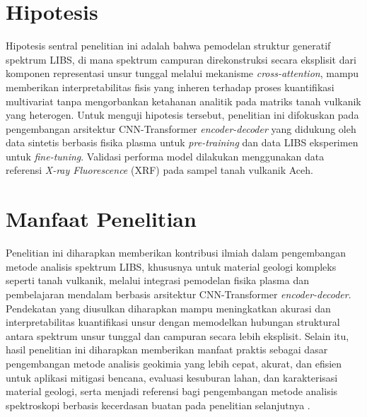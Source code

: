 \section{Hipotesis}

Hipotesis sentral penelitian ini adalah bahwa pemodelan struktur generatif spektrum LIBS, di mana spektrum campuran direkonstruksi secara eksplisit dari komponen representasi unsur tunggal melalui mekanisme \textit{cross-attention}, mampu memberikan interpretabilitas fisis yang inheren terhadap proses kuantifikasi multivariat tanpa mengorbankan ketahanan analitik pada matriks tanah vulkanik yang heterogen. Untuk menguji hipotesis tersebut, penelitian ini difokuskan pada pengembangan arsitektur CNN-Transformer \textit{encoder-decoder} yang didukung oleh data sintetis berbasis fisika plasma untuk \textit{pre-training} dan data LIBS eksperimen untuk \textit{fine-tuning}. Validasi performa model dilakukan menggunakan data referensi \textit{X-ray Fluorescence} (XRF) pada sampel tanah vulkanik Aceh.

\section{Manfaat Penelitian}
Penelitian ini diharapkan memberikan kontribusi ilmiah dalam pengembangan metode analisis spektrum LIBS, khususnya untuk material geologi kompleks seperti tanah vulkanik, melalui integrasi pemodelan fisika plasma dan pembelajaran mendalam berbasis arsitektur CNN-Transformer \textit{encoder-decoder}. Pendekatan yang diusulkan diharapkan mampu meningkatkan akurasi dan interpretabilitas kuantifikasi unsur dengan memodelkan hubungan struktural antara spektrum unsur tunggal dan campuran secara lebih eksplisit. Selain itu, hasil penelitian ini diharapkan memberikan manfaat praktis sebagai dasar pengembangan metode analisis geokimia yang lebih cepat, akurat, dan efisien untuk aplikasi mitigasi bencana, evaluasi kesuburan lahan, dan karakterisasi material geologi, serta menjadi referensi bagi pengembangan metode analisis spektroskopi berbasis kecerdasan buatan pada penelitian selanjutnya \citep{idris_geochemistry_2022, manelski_libs_2024}.